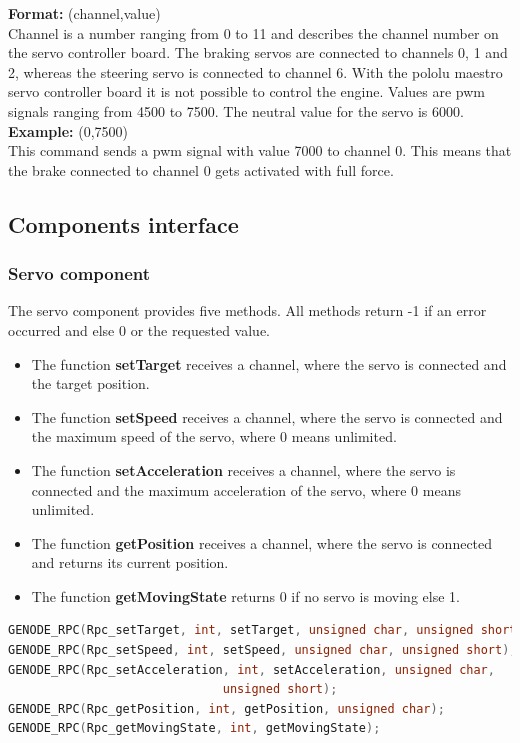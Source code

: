 \textbf{Format:} (channel,value) \\
Channel is a number ranging from 0 to 11 and describes the channel number on the servo controller board. The braking servos are connected to channels 0, 1 and 2, whereas the steering servo is connected to channel 6. With the pololu maestro servo controller board it is not possible to control the engine. Values are pwm signals ranging from 4500 to 7500. The neutral value for the servo is 6000. \\

\textbf{Example:} (0,7500) \\
This command sends a pwm signal with value 7000 to channel 0. This means that the brake connected to channel 0 gets activated with full force. 

\subsection{Components interface}
\label{sec:comp}


\subsubsection{Servo component}
\label{sec:comp-servo}

The servo component provides five methods. All methods return -1 if an error occurred and else 0 or the requested value.
\begin{itemize}
\item The function \textbf{setTarget} receives a channel, where the servo is connected and the target position.
\item The function \textbf{setSpeed} receives a channel, where the servo is connected and the maximum speed of the servo, where 0 means unlimited.
\item The function \textbf{setAcceleration} receives a channel, where the servo is connected and the maximum acceleration of the servo, where 0 means unlimited.
\item The function \textbf{getPosition} receives a channel, where the servo is connected and returns its current position.
\item The function \textbf{getMovingState} returns 0 if no servo is moving else 1.
\end{itemize}

\begin{lstlisting}[language=c, frame=single, basicstyle=\footnotesize, caption=Genode interface for servo component]
GENODE_RPC(Rpc_setTarget, int, setTarget, unsigned char, unsigned short);
GENODE_RPC(Rpc_setSpeed, int, setSpeed, unsigned char, unsigned short);
GENODE_RPC(Rpc_setAcceleration, int, setAcceleration, unsigned char, 
						      unsigned short);
GENODE_RPC(Rpc_getPosition, int, getPosition, unsigned char);
GENODE_RPC(Rpc_getMovingState, int, getMovingState);
\end{lstlisting}

